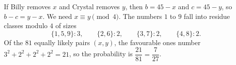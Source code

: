 If Billy removes $x$ and Crystal removes $y$, then $b=45-x$ and $c=45-y$, so $b-c=y-x$. We need $x\equiv y\pmod4$. The numbers $1$ to $9$ fall into residue classes modulo $4$ of sizes
\[
\{1,5,9\}:3,\qquad\{2,6\}:2,\qquad\{3,7\}:2,\qquad\{4,8\}:2 .
\]
Of the $81$ equally likely pairs $(x,y)$, the favourable ones number $3^2+2^2+2^2+2^2=21$, so the probability is $\dfrac{21}{81}=\boxed{\dfrac{7}{27}}$.
